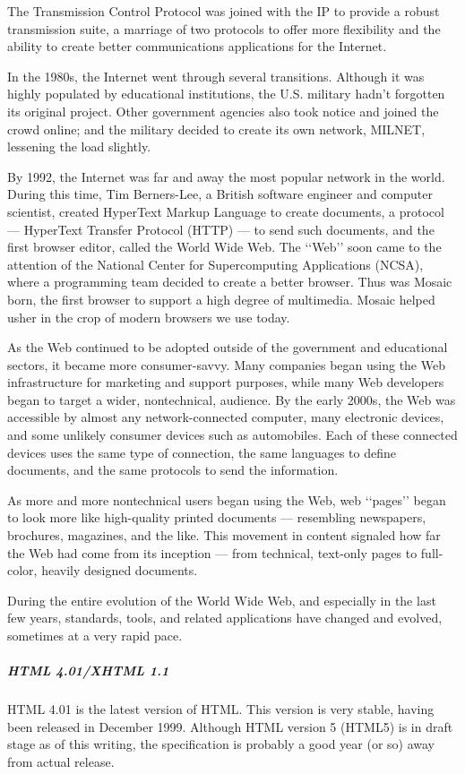 The Transmission Control Protocol was joined with the IP to provide a robust transmission suite,
a marriage of two protocols to offer more flexibility and the ability to create better communications
applications for the Internet.\cite{2}

In the 1980s, the Internet went through several transitions. Although it was highly populated by
educational institutions, the U.S. military hadn’t forgotten its original project. Other government
agencies also took notice and joined the crowd online; and the military decided to create its own
network, MILNET, lessening the load slightly.\cite{2}

By 1992, the Internet was far and away the most popular network in the world. During this
time, Tim Berners-Lee, a British software engineer and computer scientist, created HyperText
Markup Language to create documents, a protocol — HyperText Transfer Protocol (HTTP) — to send such documents, and the first browser editor, called the World Wide Web. The ‘‘Web’’ soon
came to the attention of the National Center for Supercomputing Applications (NCSA), where a
programming team decided to create a better browser. Thus was Mosaic born, the first browser
to support a high degree of multimedia. Mosaic helped usher in the crop of modern browsers we
use today.\cite{2}

As the Web continued to be adopted outside of the government and educational sectors, it
became more consumer-savvy. Many companies began using the Web infrastructure for marketing
and support purposes, while many Web developers began to target a wider, nontechnical,
audience.
By the early 2000s, the Web was accessible by almost any network-connected computer, many
electronic devices, and some unlikely consumer devices such as automobiles. Each of these connected
devices uses the same type of connection, the same languages to define documents, and
the same protocols to send the information.\cite{2}

As more and more nontechnical users began using the Web, web ‘‘pages’’ began to look more
like high-quality printed documents — resembling newspapers, brochures, magazines, and the
like. This movement in content signaled how far the Web had come from its inception — from
technical, text-only pages to full-color, heavily designed documents.\cite{2}

During the entire evolution of the World Wide Web, and especially in the last few years, standards,
tools, and related applications have changed and evolved, sometimes at a very rapid pace.
\subparagraph*{HTML 4.01/XHTML 1.1}
\hfill \break
HTML 4.01 is the latest version of HTML. This version is very stable, having been released in
December 1999. Although HTML version 5 (HTML5) is in draft stage as of this writing, the
specification is probably a good year (or so) away from actual release.\cite{2}

